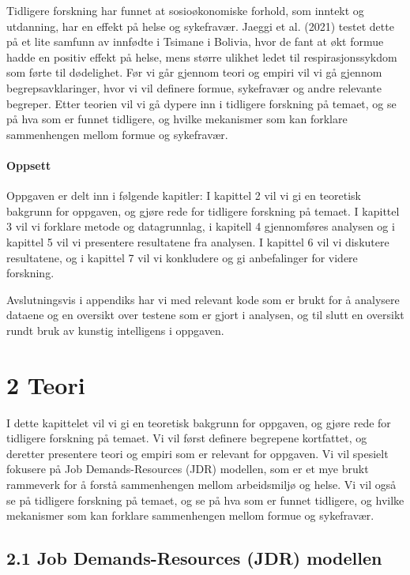 \documentclass[
  12pt,
  a4paper,
  DIV=11,
  numbers=noendperiod]{scrartcl}
\let\oldparagraph\paragraph
\renewcommand{\paragraph}[1]{\oldparagraph{#1}\mbox{}}
\begin{document}
Tidligere forskning har funnet at sosioøkonomiske forhold, som inntekt
og utdanning, har en effekt på helse og sykefravær. Jaeggi et al. (2021)
testet dette på et lite samfunn av innfødte i Tsimane i Bolivia, hvor de
fant at økt formue hadde en positiv effekt på helse, mens større ulikhet
ledet til respirasjonssykdom som førte til dødelighet. Før vi går
gjennom teori og empiri vil vi gå gjennom begrepsavklaringer, hvor vi
vil definere formue, sykefravær og andre relevante begreper. Etter
teorien vil vi gå dypere inn i tidligere forskning på temaet, og se på
hva som er funnet tidligere, og hvilke mekanismer som kan forklare
sammenhengen mellom formue og sykefravær.

\paragraph{Oppsett}\label{oppsett}

Oppgaven er delt inn i følgende kapitler: I kapittel 2 vil vi gi en
teoretisk bakgrunn for oppgaven, og gjøre rede for tidligere forskning
på temaet. I kapittel 3 vil vi forklare metode og datagrunnlag, i
kapitell 4 gjennomføres analysen og i kapittel 5 vil vi presentere
resultatene fra analysen. I kapittel 6 vil vi diskutere resultatene, og
i kapittel 7 vil vi konkludere og gi anbefalinger for videre forskning.

Avslutningsvis i appendiks har vi med relevant kode som er brukt for å
analysere dataene og en oversikt over testene som er gjort i analysen,
og til slutt en oversikt rundt bruk av kunstig intelligens i oppgaven.
\newpage

\section{2 Teori}\label{teori}

I dette kapittelet vil vi gi en teoretisk bakgrunn for oppgaven, og
gjøre rede for tidligere forskning på temaet. Vi vil først definere
begrepene kortfattet, og deretter presentere teori og empiri som er
relevant for oppgaven. Vi vil spesielt fokusere på Job Demands-Resources
(JDR) modellen, som er et mye brukt rammeverk for å forstå sammenhengen
mellom arbeidsmiljø og helse. Vi vil også se på tidligere forskning på
temaet, og se på hva som er funnet tidligere, og hvilke mekanismer som
kan forklare sammenhengen mellom formue og sykefravær.

\subsection{2.1 Job Demands-Resources (JDR)
modellen}\label{job-demands-resources-jdr-modellen}
\end{document}
